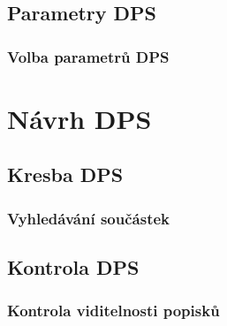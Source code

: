 \documentclass{beamer}
\begin{document}
\subsection{\texorpdfstring{Parametry DPS}{Parametry DPS}}
\begin{frame}
	\frametitle{Volba parametrů DPS}
	
\end{frame}

\section{\texorpdfstring{Návrh DPS}{Navrh DPS}}
\subsection{\texorpdfstring{Kresba DPS}{Kresba DPS}}
\begin{frame}
	\frametitle{Vyhledávání součástek}
		
\end{frame}

\subsection{\texorpdfstring{Kontrola DPS}{Kontrola DPS}}
\begin{frame}
	\frametitle{Kontrola viditelnosti popisků}
	
\end{frame}
\end{document}
